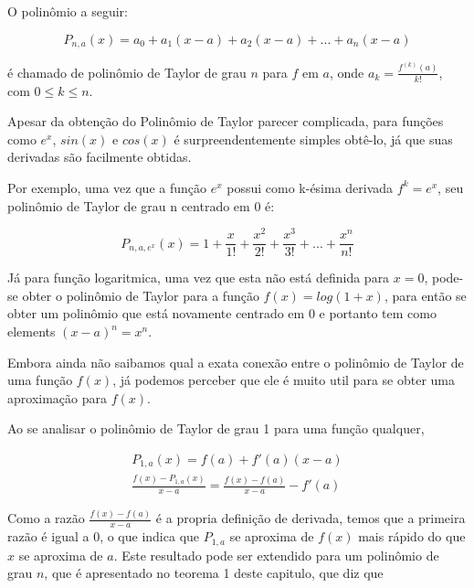 \documentclass[a4paper, 12pt]{article}
\begin{document}
O polinômio a seguir:

\begin{centering}
	\begin{equation}
		P_{n,a}(x) = a_0 + a_1(x-a) + a_2(x-a) + ... + a_n(x-a)
	\end{equation}
\end{centering}

é chamado de polinômio de Taylor de grau $n$ para $f$ em $a$,
onde $a_k = \frac{f^{(k)}(a)}{k!}$, com $0 \leq k \leq n$.

Apesar da obtenção do Polinômio de Taylor parecer complicada, para funções como
$e^x$, $sin(x)$ e $cos(x)$ é surpreendentemente simples obtê-lo, já que suas derivadas são facilmente obtidas.

Por exemplo, uma vez que a função $e^x$ possui como k-ésima derivada $f^{k} = e^x$, seu
polinômio de Taylor de grau n centrado em 0 é:

\begin{centering}
	\begin{equation}
		P_{n,a,e^x}(x) = 1 + \frac{x}{1!} + \frac{x^2}{2!} + \frac{x^3}{3!} + ...  + \frac{x^n}{n!}
	\end{equation}
\end{centering}

Já para função logaritmica, uma vez que esta não está definida para $x = 0$, pode-se obter o
polinômio de Taylor para a função $f(x) = log(1+x)$, para então se obter um polinômio que
está novamente centrado em $0$ e portanto tem como elements $(x-a)^n = x^n$.

Embora ainda não saibamos qual a exata conexão entre o polinômio de Taylor de uma função $f(x)$,
já podemos perceber que ele é muito util para se obter uma aproximação para $f(x)$.

Ao se analisar o polinômio de Taylor de grau 1 para uma função qualquer,

\begin{centering}
	\begin{align}
		P_{1,a}(x) = f(a) + f'(a)(x-a) \\
		\frac{f(x) - P_{1,a}(x)}{x-a} = \frac{f(x) - f(a)}{x-a} - f'(a)
	\end{align}
\end{centering}

Como a razão $\frac{f(x) - f(a)}{x-a}$ é a propria definição de derivada, temos que a primeira
razão é igual a $0$, o que indica que $P_{1,a}$ se aproxima de $f(x)$ mais rápido do que $x$
se aproxima de $a$. Este resultado pode ser extendido para um polinômio de grau $n$, que é
apresentado no teorema 1 deste capitulo, que diz que
\end{document}
